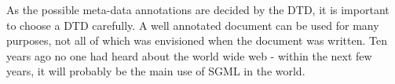 As the possible meta-data annotations are decided by the DTD, it is
important to choose a DTD carefully.  A well annotated document can be
used for many purposes, not all of which was envisioned when the
document was written.  Ten years ago no one had heard about the world
wide web - within the next few years, it will probably be the main use
of SGML in the world.












